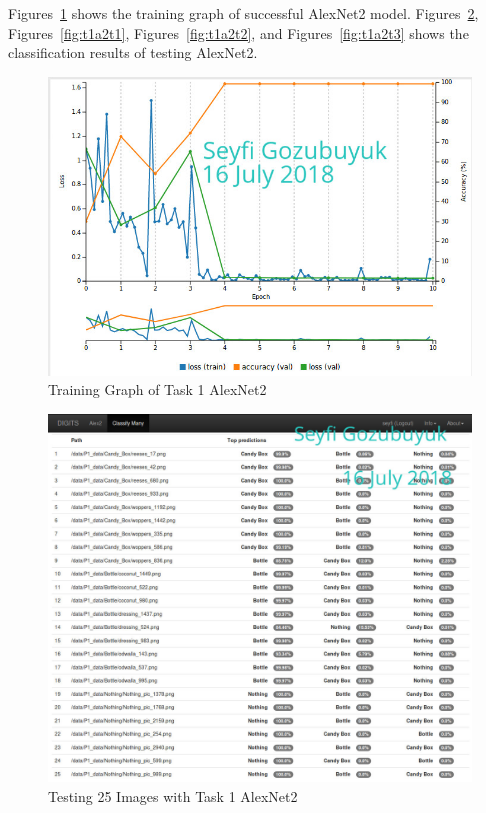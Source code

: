 \documentclass[10pt,journal,compsoc]{IEEEtran}
\begin{document}
Figures~\ref{fig:t1a2g} shows the training graph of successful AlexNet2 model. Figures~\ref{fig:t1a2l}, Figures~\ref{fig:t1a2t1}, Figures~\ref{fig:t1a2t2}, and Figures~\ref{fig:t1a2t3} shows the classification results of testing AlexNet2.

\begin{figure}[thpb]
      \centering
      \includegraphics[width=\linewidth]{figures/t1a2g.png}
      \caption{Training Graph of Task 1 AlexNet2}
      \label{fig:t1a2g}
\end{figure}

\begin{figure}[thpb]
      \centering
      \includegraphics[width=\linewidth]{figures/t1a2l.png}
      \caption{Testing 25 Images with Task 1 AlexNet2}
      \label{fig:t1a2l}
\end{figure}
\end{document}
